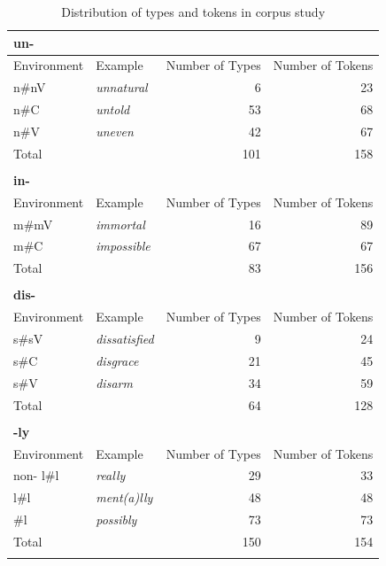 \begin{table}
	\caption{Distribution of types and tokens in corpus study}
	\label{tbl:distribution of types and tokens in corpus}
	
		
		\begin{tabular} {llrr}
				\lsptoprule	
			\textbf{un-}&&&\\
						\midrule   	
			Environment & Example & Number of Types & Number of Tokens\\
			\midrule
			n\#nV&\color{lsMidBlue}\textit{unnatural} & 6 & 23\\ 
			n\#C&\color{lsMidBlue}\textit{untold} & 53 & 68\\ 
			n\#V&\color{lsMidBlue}\textit{uneven} & 42 & 67\\
			\midrule
			Total&  & 101 & 158\\ 
			\midrule
			\\
			\textbf{in-}&&&\\
						\midrule   	
			Environment & Example & Number of Types & Number of Tokens\\
			\midrule
			m\#mV&\color{lsMidBlue}\textit{immortal} & 16 & 89\\ 
			m\#C&\color{lsMidBlue}\textit{impossible} & 67 & 67\\ 
			\midrule   
			Total&  & 83 & 156\\ 
			\midrule     	
			\\
			\textbf{dis-}&&&\\
									\midrule   	
			Environment & Example & Number of Types & Number of Tokens\\
			\midrule
			s\#sV&\color{lsMidBlue}\textit{dissatisfied} & 9 & 24\\ 
			s\#C&\color{lsMidBlue}\textit{disgrace} & 21 & 45\\ 
			s\#V&\color{lsMidBlue}\textit{disarm} & 34 & 59\\ 
			\midrule   	
			Total&  & 64 & 128\\ 
			\midrule   	
			\\
			\textbf{-ly}&&&\\
						\midrule   	
			Environment & Example & Number of Types & Number of Tokens\\
			\midrule
			non-\isi{syllabic} l\#l &\color{lsMidBlue}\textit{really} & 29  & 33 \\ 
			\isi{syllabic} 	l\#l &\color{lsMidBlue}\textit{ment(a)lly} & 48 & 48 \\ 
			\#l &\color{lsMidBlue}\textit{possibly} & 73 & 73\\ 
			\midrule   	
			Total&  & 150  & 154\\ 
			\lspbottomrule                                                                                
		\end{tabular}
		
	
\end{table}







